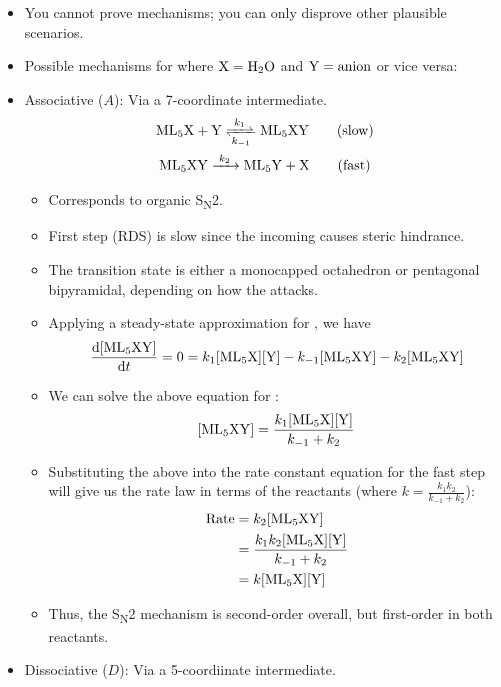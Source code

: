 \documentclass[../notes.tex]{subfiles}
\begin{document}
\begin{itemize}
    \item You cannot prove mechanisms; you can only disprove other plausible scenarios.
    \item Possible mechanisms for  where $\ce{X}=\ce{H2O}$ and $\ce{Y}=\text{anion}$ or vice versa:
    \item Associative ($A$): Via a 7-coordinate intermediate.
    \begin{gather*}
        \ce{ML5X + Y <=>[$k_1$][$k_{-1}$] ML5XY}\tag{slow}\\
        \ce{ML5XY ->[$k_2$] ML5Y + X}\tag{fast}
    \end{gather*}
    \begin{itemize}
        \item Corresponds to organic S\textsubscript{N}2.
        \item First step (RDS) is slow since the incoming  causes steric hindrance.
        \item The transition state is either a monocapped octahedron or pentagonal bipyramidal, depending on how the  attacks.
        \item Applying a steady-state approximation for \ce{[ML5XY]}, we have
        \begin{equation*}
            \dv{\ce{[ML5XY]}}{t} = 0 = k_1\ce{[ML5X][Y]}-k_{-1}\ce{[ML5XY]}-k_2\ce{[ML5XY]}
        \end{equation*}
        \item We can solve the above equation for \ce{[ML5XY]}:
        \begin{equation*}
            \ce{[ML5XY]} = \frac{k_1\ce{[ML5X][Y]}}{k_{-1}+k_2}
        \end{equation*}
        \item Substituting the above into the rate constant equation for the fast step will give us the rate law in terms of the reactants (where $k=\frac{k_1k_2}{k_{-1}+k_2}$):
        \begin{align*}
            \text{Rate} &= k_2\ce{[ML5XY]}\\
            &= \frac{k_1k_2\ce{[ML5X][Y]}}{k_{-1}+k_2}\\
            &= k\ce{[ML5X][Y]}
        \end{align*}
        \item Thus, the S\textsubscript{N}2 mechanism is second-order overall, but first-order in both reactants.
    \end{itemize}
    \item Dissociative ($D$): Via a 5-coordiinate intermediate.

\end{itemize}
\end{document}
